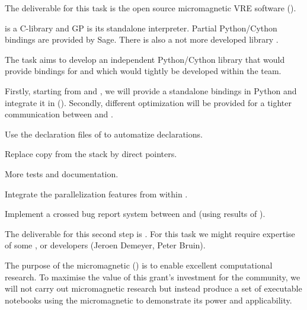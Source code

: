 \begin{workpackage}
\begin{tasklist}
\begin{task}[lead=USO,title=Case study: micromagnetic VRE built from
  \TheProject,id=oommf-py-ipython-attributes,PM=6,partners={SR,USH},wphases=9-15]
  The deliverable for this task is the open source micromagnetic VRE
  software ().
\end{task}

\begin{task}[lead=UB,title=Python/Cython bindings for \Pari,PM=16,id=pari-python,wphases=0-48]
  \Pari is a C-library and GP is its standalone interpreter. Partial
  Python/Cython bindings are provided by Sage. There is also a not
  more developed library .

  The task aims to develop an independent Python/Cython library that
  would provide bindings for \PariGP and which would tightly be
  developed within the \PariGP team.

  Firstly, starting from \Sage and , we will provide a standalone \Pari bindings in Python
  and integrate it in \Sage (). Secondly, different optimization
  will be provided for a tighter communication between \Pari and \Python.
  \begin{compactitem}
  \item Use the declaration files of  to automatize \Cython declarations.
  \item Replace copy from the \Pari stack by direct pointers.
  \item More tests and documentation.
  \item Integrate the parallelization features from  within \Python.
  \item Implement a crossed bug report system between \Sage and \Pari (using
  results of ).
  \end{compactitem}
  The deliverable for this second step is . For this task we might
  require expertise of some \Sage, \Pari or \Cython developers (Jeroen Demeyer, Peter Bruin).
\end{task}

\begin{task}[lead=USO,title=Demonstrator: micromagnetic VRE notebooks,
  id=oommf-tutorial-and-documentation,PM=6,partners={SR,PS},wphases=15-21]

  The purpose of the micromagnetic \VRE
  () is to enable excellent
  computational research. To maximise the value of this grant's
  investment for the community, we will not carry out micromagnetic
  research but instead produce a set of executable notebooks using the
  micromagnetic \VRE to demonstrate its power and applicability.


\end{task}
\end{tasklist}
\end{workpackage}
